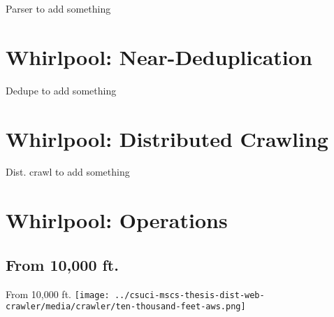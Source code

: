 \documentclass[9pt]{beamer}
\begin{document}

\begin{frame}{Parser}
  to add something
\end{frame}


\section[Deduplication]{Whirlpool: Near-Deduplication}
\begin{frame}[plain]
\end{frame}


\begin{frame}{Dedupe}
  to add something
\end{frame}


\section[Dist. Crawling]{Whirlpool: Distributed Crawling}
\begin{frame}[plain]
\end{frame}


\begin{frame}{Dist. crawl}
  to add something
\end{frame}


\section[Opworks]{Whirlpool: Operations}
\begin{frame}[plain]
\end{frame}


\subsection{From 10,000 ft.}
\begin{frame}{From 10,000 ft.}
 \centering
 \texttt{[image: ../csuci-mscs-thesis-dist-web-crawler/media/crawler/ten-thousand-feet-aws.png]} 
\end{frame}
\end{document}
